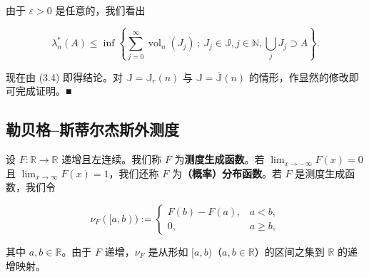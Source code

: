 \begin{proposition}
由于 $ \varepsilon > 0 $ 是任意的，我们看出

\[
\lambda_n^*(A) \le \inf\left\{ \sum_{j=0}^{\infty} \operatorname{vol}_n(J_j) \,;\ J_j \in \mathbb{J}, j \in \mathbb{N}, \bigcup_j J_j \supset A \right\} .
\]

现在由 (3.4) 即得结论。对 $ \mathbb{J} = \mathbb{J}_r(n) $ 与 $ \mathbb{J} = \overline{\mathbb{J}}(n) $ 的情形，作显然的修改即可完成证明。\nobreak\hspace{0.35em}■

\end{proposition}

\subsection*{勒贝格–斯蒂尔杰斯外测度}

设 $ F\colon \mathbb{R} \to \mathbb{R} $ 递增且左连续。我们称 $ F $ 为\textbf{测度生成函数}。若 $ \lim_{x \to -\infty} F(x) = 0 $ 且 $ \lim_{x \to \infty} F(x) = 1 $，我们还称 $ F $ 为\textbf{（概率）分布函数}。若 $ F $ 是测度生成函数，我们令

\begin{equation*}
\nu_F([a,b)) := \begin{cases} F(b) - F(a) , & a < b , \\ 0 , & a \ge b , \end{cases}
\end{equation*}

其中 $ a, b \in \mathbb{R} $。由于 $ F $ 递增，$ \nu_F $ 是从形如 $ [a, b) $（$ a, b \in \mathbb{R} $）的区间之集到 $ \mathbb{R} $ 的递增映射。

